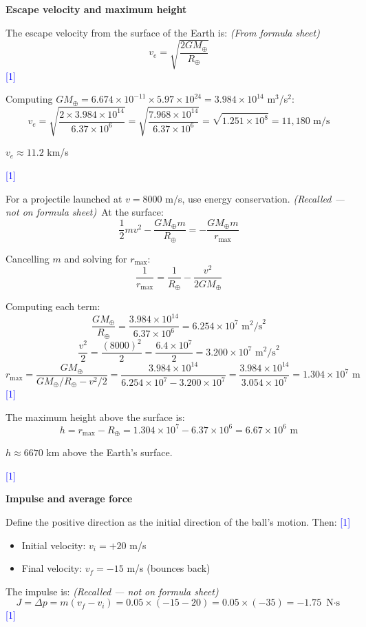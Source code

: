 \documentclass[12pt,a4paper]{article}
\newcommand{\markstep}[1]{\hfill\textcolor{blue}{[#1]}}
\newcommand{\finalanswer}[1]{%
  \begin{tcolorbox}[colback=green!5!white,colframe=green!50!black,boxrule=0.5pt]
  #1
  \end{tcolorbox}
}
\newcommand{\fromsheet}{\textit{(From formula sheet)}}
\newcommand{\recalled}{\textit{(Recalled --- not on formula sheet)}}
\begin{document}
\begin{parts}
\item \textbf{Escape velocity and maximum height} 

The escape velocity from the surface of the Earth is: \fromsheet
\[
v_e = \sqrt{\frac{2GM_\oplus}{R_\oplus}}
\]
\markstep{1}

Computing $GM_\oplus = 6.674\times 10^{-11}\times 5.97\times 10^{24} = 3.984\times 10^{14}$ m$^3$/s$^2$:
\[
v_e = \sqrt{\frac{2\times 3.984\times 10^{14}}{6.37\times 10^{6}}} = \sqrt{\frac{7.968\times 10^{14}}{6.37\times 10^{6}}} = \sqrt{1.251\times 10^{8}} = 11{,}180\text{ m/s}
\]

\finalanswer{$v_e \approx 11.2$ km/s}
\markstep{1}

For a projectile launched at $v = 8000$ m/s, use energy conservation. \recalled\ At the surface:
\[
\frac{1}{2}mv^2 - \frac{GM_\oplus m}{R_\oplus} = -\frac{GM_\oplus m}{r_{\max}}
\]

Cancelling $m$ and solving for $r_{\max}$:
\[
\frac{1}{r_{\max}} = \frac{1}{R_\oplus} - \frac{v^2}{2GM_\oplus}
\]

Computing each term:
\[
\frac{GM_\oplus}{R_\oplus} = \frac{3.984\times 10^{14}}{6.37\times 10^{6}} = 6.254\times 10^{7}\text{ m}^2\text{/s}^2
\]
\[
\frac{v^2}{2} = \frac{(8000)^2}{2} = \frac{6.4\times 10^{7}}{2} = 3.200\times 10^{7}\text{ m}^2\text{/s}^2
\]
\[
r_{\max} = \frac{GM_\oplus}{GM_\oplus/R_\oplus - v^2/2} = \frac{3.984\times 10^{14}}{6.254\times 10^{7} - 3.200\times 10^{7}} = \frac{3.984\times 10^{14}}{3.054\times 10^{7}} = 1.304\times 10^{7}\text{ m}
\]
\markstep{1}

The maximum height above the surface is:
\[
h = r_{\max} - R_\oplus = 1.304\times 10^{7} - 6.37\times 10^{6} = 6.67\times 10^{6}\text{ m}
\]

\finalanswer{$h \approx 6670$ km above the Earth's surface.}
\markstep{1}

\item \textbf{Impulse and average force} 

Define the positive direction as the initial direction of the ball's motion. Then: \markstep{1}
\begin{itemize}
\item Initial velocity: $v_i = +20$ m/s
\item Final velocity: $v_f = -15$ m/s (bounces back)
\end{itemize}

The impulse is: \recalled
\[
J = \Delta p = m(v_f - v_i) = 0.05\times(-15 - 20) = 0.05\times(-35) = -1.75\text{ N$\cdot$s}
\]
\markstep{1}


\end{parts}
\end{document}
